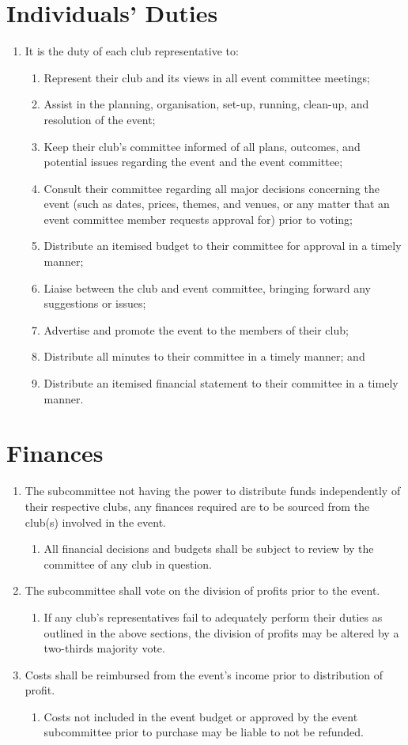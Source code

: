 \documentclass[a4paper]{article}
\newenvironment{enumsection}[1]{\section{#1} \begin{enumerate}[ref=\thesection.\theenumi]}{\end{enumerate}}
\begin{document}
\begin{enumsection}{Individuals' Duties}
    \item It is the duty of each club representative to:
    \begin{enumerate}
        \item Represent their club and its views in all event committee meetings;
        \item Assist in the planning, organisation, set-up, running, clean-up, and resolution of the event;
        \item Keep their club's committee informed of all plans, outcomes, and potential issues regarding the event and the event committee;
        \item Consult their committee regarding all major decisions concerning the event (such as dates, prices, themes, and venues, or any matter that an event committee member requests approval for) prior to voting;
        \item Distribute an itemised budget to their committee for approval in a timely manner;
        \item Liaise between the club and event committee, bringing forward any suggestions or issues;
        \item Advertise and promote the event to the members of their club;
        \item Distribute all minutes to their committee in a timely manner; and
        \item Distribute an itemised financial statement to their committee in a timely manner.
    \end{enumerate}
\end{enumsection}

\begin{enumsection}{Finances}
    \item The subcommittee not having the power to distribute funds independently of their respective clubs, any finances required are to be sourced from the club(s) involved in the event.
    \begin{enumerate}
        \item All financial decisions and budgets shall be subject to review by the committee of any club in question.
    \end{enumerate}
    \item The subcommittee shall vote on the division of profits prior to the event.
    \begin{enumerate}
        \item If any club's representatives fail to adequately perform their duties as outlined in the above sections, the division of profits may be altered by a two-thirds majority vote.
    \end{enumerate}
    \item Costs shall be reimbursed from the event's income prior to distribution of profit.
    \begin{enumerate}
        \item Costs not included in the event budget or approved by the event subcommittee prior to purchase may be liable to not be refunded.
    \end{enumerate}
\end{enumsection}
\end{document}
